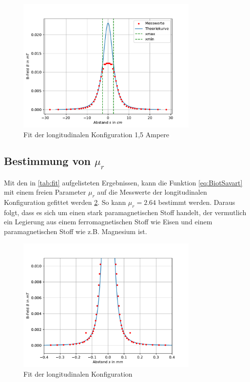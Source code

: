 \documentclass[11pt, a4paper]{article}
\begin{document}
    \begin{figure}
        \centering
        \includegraphics[width=0.8\textwidth]{fit15a.pdf}
        \caption{Fit der longitudinalen Konfiguration 1,5 Ampere}
        \label{fig:longfit15a}
    \end{figure}

    \subsection{Bestimmung von $\mu_r$}
    Mit den in \ref{tab:fit} aufgelisteten Ergebnissen, kann die Funktion \ref{eq:BiotSavart} mit einem freien Parameter $\mu_r$ auf die Messwerte der longitudinalen Konfiguration gefittet werden \ref{fig:murfit}. So kann $\mu_r = 2.64$ bestimmt werden.
    Daraus folgt, dass es sich um einen stark paramagnetischen Stoff handelt, der vermutlich ein Legierung aus einem ferromagnetischen Stoff wie Eisen und einem paramagnetischen Stoff wie z.B. Magnesium ist.
    \begin{figure}
        \centering
        \includegraphics[width=0.8\textwidth]{mur.pdf}
        \caption{Fit der longitudinalen Konfiguration}
        \label{fig:murfit}
    \end{figure}
\end{document}
